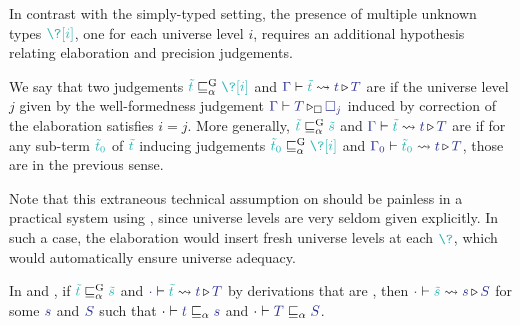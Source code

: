 In contrast with the simply-typed setting, the presence of multiple unknown types
$\scol{\?[i]}$, one for each universe level $i$,
requires an additional hypothesis relating elaboration and precision judgements.

\begin{definition}
  We say that two judgements $\scol{\tilde{t}} \apre \scol{\?[i]}$ and
  $\inferelab{\Gamma}{\tilde{t}}{t}{T}$ are  if the
  universe level $j$ given by the well-formedness judgement
  $\pinferty{\uni}{\tcol{\Gamma}}{\tcol{T}}{\tcol{\uni[j]}}$
  induced by correction of the elaboration satisfies $i = j$.
  More generally, $\scol{\tilde{t}} \apre \scol{\tilde{s}}$ and
  $\inferelab{\Gamma}{\tilde{t}}{t}{T}$ are  if for any
  sub-term $\scol{\tilde{t}_0}$ of $\scol{\tilde{t}}$ inducing judgements $\scol{\tilde{t}_0}
  \apre \scol{\?[i]}$ and $\inferelab{\Gamma_0}{\tilde{t}_0}{t}{T}$,
  those are  in the previous sense.
\end{definition}

Note that this extraneous technical assumption on 
should be painless in a practical system using ,
since universe levels are very seldom given explicitly. In such a case, the elaboration
would insert fresh universe levels at each $\scol{\?}$, which would automatically ensure
universe adequacy.

\begin{theorem}
	\label{thm:static-graduality}

  In  and , if $\scol{\tilde{t}} \apre \scol{\tilde{s}}$ and
  $\inferelab{\emptycon}{\tilde{t}}{t}{T}$ by derivations that are ,
  then $\inferelab{\emptycon}{\tilde{s}}{s}{S}$ for some $\tcol{s}$ and $\tcol{S}$
  such that $\emptycon \vdash \tcol{t} \capre \tcol{s}$
  and $\emptycon \vdash \tcol{T} \capre \tcol{S}$.
\end{theorem}

